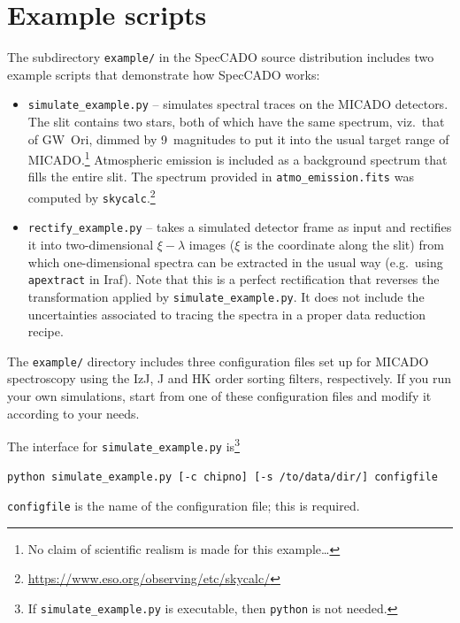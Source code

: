 \documentclass[a4paper,twoside,11pt]{article}
\begin{document}


\section{Example scripts}
\label{sec:examples}

The subdirectory \lstinline{example/} in the SpecCADO source
distribution includes two example scripts that demonstrate how
SpecCADO works:
\begin{itemize}
\item \lstinline{simulate_example.py} -- simulates spectral traces on
  the MICADO detectors. The slit contains two stars, both of which
  have the same spectrum, viz.~that of GW~Ori, dimmed by 9~magnitudes
  to put it into the usual target range of MICADO.\footnote{No claim
    of scientific realism is made for this example\dots} Atmospheric
  emission is included as a background spectrum that fills the entire
  slit. The spectrum provided in \lstinline{atmo_emission.fits} was
  computed by
  \lstinline{skycalc}.\footnote{\url{https://www.eso.org/observing/etc/skycalc/}}
\item \lstinline{rectify_example.py} -- takes a simulated detector
  frame as input and rectifies it into two-dimensional $\xi-\lambda$
  images ($\xi$ is the coordinate along the slit) from which
  one-dimensional spectra can be extracted in the usual way
  (e.g.~using \lstinline{apextract} in Iraf). Note that this is a
  perfect rectification that reverses the transformation applied by
  \lstinline{simulate_example.py}. It does not include the
  uncertainties associated to tracing the spectra in a proper data
  reduction recipe.
\end{itemize}

The \lstinline{example/} directory includes three configuration files
set up for MICADO spectroscopy using the IzJ, J and HK order sorting
filters, respectively. If you run your own simulations, start from one
of these configuration files and modify it according to your needs.

The interface for \lstinline{simulate_example.py} is\footnote{If
  \lstinline{simulate_example.py} is executable, then
  \lstinline{python} is not needed.}
\begin{lstlisting}[style=csh]
python simulate_example.py [-c chipno] [-s /to/data/dir/] configfile
\end{lstlisting}
\lstinline{configfile} is the name of the configuration file; this is
required.
\end{document}
